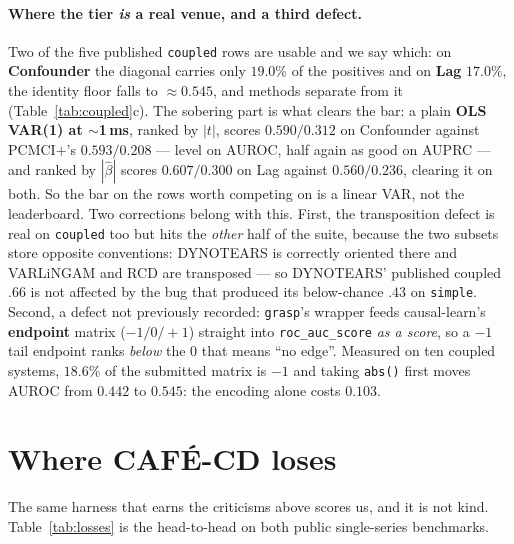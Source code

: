 \documentclass[10pt,twocolumn]{article}
\newcommand{\cafe}{CAF\'E}
\DeclareRobustCommand{\cd}{\cafe{}\nobreakdash-CD}
\begin{document}
\paragraph{Where the tier \emph{is} a real venue, and a third defect.} Two of the five
published \texttt{coupled} rows are usable and we say which: on \textbf{Confounder} the
diagonal carries only $19.0\%$ of the positives and on \textbf{Lag} $17.0\%$, the
identity floor falls to $\approx0.545$, and methods separate from it
(Table~\ref{tab:coupled}c). The sobering part is what clears the bar: a plain
\textbf{OLS VAR(1) at $\sim$1\,ms}, ranked by $|t|$, scores $0.590/0.312$ on Confounder
against PCMCI$+$'s $0.593/0.208$ --- level on AUROC, half again as good on AUPRC ---
and ranked by $|\hat\beta|$ scores $0.607/0.300$ on Lag against $0.560/0.236$, clearing
it on both. So the bar on the rows worth competing on is a linear VAR, not the
leaderboard. Two corrections belong with
this. First, the transposition defect is real on \texttt{coupled} too but hits the
\emph{other} half of the suite, because the two subsets store opposite conventions:
DYNOTEARS is correctly oriented there and VARLiNGAM and RCD are transposed --- so
DYNOTEARS' published coupled $.66$ is not affected by the bug that produced its
below-chance $.43$ on \texttt{simple}. Second, a defect not previously recorded:
\texttt{grasp}'s wrapper feeds causal-learn's \textbf{endpoint} matrix
($-1/0/+1$) straight into \texttt{roc\_auc\_score} \emph{as a score}, so a $-1$ tail
endpoint ranks \emph{below} the $0$ that means ``no edge''. Measured on ten coupled
systems, $18.6\%$ of the submitted matrix is $-1$ and taking \texttt{abs()} first moves
AUROC from $0.442$ to $0.545$: the encoding alone costs $0.103$.

\section{Where \texorpdfstring{\cd{}}{CAFE-CD} loses}\label{sec:losses}
The same harness that earns the criticisms above scores us, and it is not kind.
Table~\ref{tab:losses} is the head-to-head on both public single-series benchmarks.


\end{document}
